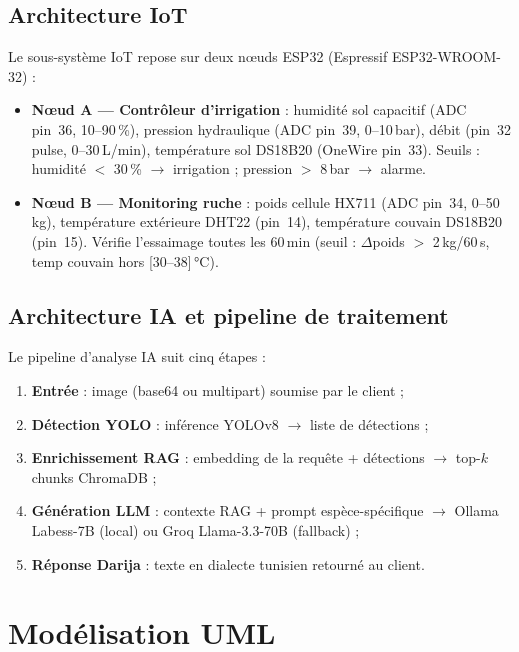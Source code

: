 \documentclass[12pt,a4paper,twoside]{report}
\newcounter{hi}
\begin{document}
\subsection{Architecture IoT}

Le sous-système IoT repose sur deux nœuds ESP32 (Espressif ESP32-WROOM-32) :
\begin{itemize}
  \item \textbf{Nœud A — Contrôleur d'irrigation} :
        humidité sol capacitif (ADC pin~36, 10--90\,\%), pression hydraulique
        (ADC pin~39, 0--10\,bar), débit (pin~32 pulse, 0--30\,L/min),
        température sol DS18B20 (OneWire pin~33).
        Seuils : humidité $<$ 30\,\% $\rightarrow$ irrigation ; pression $>$ 8\,bar $\rightarrow$ alarme.
  \item \textbf{Nœud B — Monitoring ruche} :
        poids cellule HX711 (ADC pin~34, 0--50\,kg),
        température extérieure DHT22 (pin~14),
        température couvain DS18B20 (pin~15).
        Vérifie l'essaimage toutes les 60\,min
        (seuil : $\Delta$poids $>$ 2\,kg/60\,s, temp couvain hors [30--38]\,°C).
\end{itemize}

\subsection{Architecture IA et pipeline de traitement}

Le pipeline d'analyse IA suit cinq étapes :
\begin{enumerate}
  \item \textbf{Entrée} : image (base64 ou multipart) soumise par le client ;
  \item \textbf{Détection YOLO} : inférence YOLOv8 $\rightarrow$ liste de détections ;
  \item \textbf{Enrichissement RAG} : embedding de la requête + détections $\rightarrow$ top-$k$ chunks ChromaDB ;
  \item \textbf{Génération LLM} : contexte RAG + prompt espèce-spécifique $\rightarrow$ Ollama Labess-7B (local) ou Groq Llama-3.3-70B (fallback) ;
  \item \textbf{Réponse Darija} : texte en dialecte tunisien retourné au client.
\end{enumerate}

\section{Modélisation UML}
\end{document}

